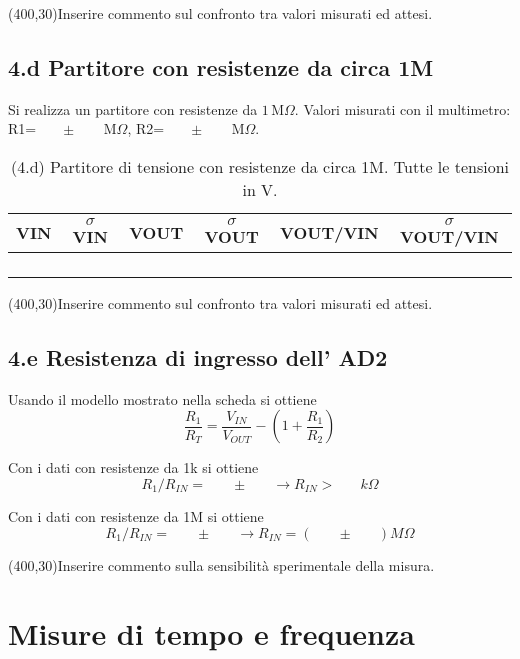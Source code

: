 \documentclass[10pt,a4paper]{article}
\newcommand{\exn}{\phantom{xxx}}
\begin{document}
\framebox(400,30){Inserire commento sul confronto tra valori misurati ed attesi.}


\subsection*{4.d Partitore con resistenze da circa 1M}
\par
Si realizza un partitore con resistenze da $1 \,\mathrm{M}\Omega$. Valori misurati con il multimetro: R1=$\exn \pm \exn \,\mathrm{M}\Omega$, R2=$\exn \pm \exn \,\mathrm{M}\Omega$.


\begin{table}[h]
\centering
\begin{tabular}{|c|c|c|c|c|c|}
\hline 
VIN& $\sigma$ VIN  &VOUT	 & $\sigma$ VOUT& VOUT/VIN & $\sigma$ VOUT/VIN \\
\hline 
\exn & \exn & \exn & \exn & \exn &\exn \\
\exn & \exn & \exn & \exn & \exn &\exn \\
\exn & \exn & \exn & \exn & \exn &\exn \\
\exn & \exn & \exn & \exn & \exn &\exn \\
\hline 
\end{tabular} 
\caption{(4.d) Partitore di tensione con resistenze da circa 1M. Tutte le tensioni in V.\label{t:par2}}
\end{table}


\framebox(400,30){Inserire commento sul confronto tra valori misurati ed attesi.}



\subsection*{4.e Resistenza di ingresso dell' AD2}
Usando il modello mostrato nella scheda si ottiene
\[ \frac{R_1}{R_T} =  \frac{V_{IN}}{V_{OUT}} - (1 +  \frac{R_1}{R_2} )
\]

Con i dati con resistenze da 1k si ottiene
\[ R_1/R_{IN} = \exn  \pm  \exn   \rightarrow  R_{IN} > \exn k\Omega
\]


Con i dati con resistenze da 1M si ottiene
\[ R_1/R_{IN} = \exn  \pm  \exn   \rightarrow  R_{IN} = (\exn \pm  \exn)  M\Omega
\]

\framebox(400,30){Inserire commento sulla sensibilit\`a sperimentale della misura.} 




\section{Misure di tempo e frequenza}
\end{document}

